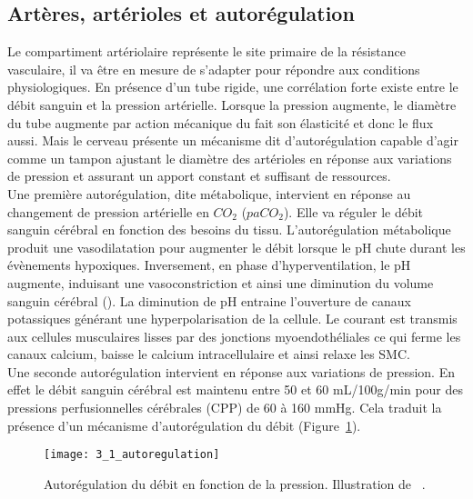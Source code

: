 \subsection{Artères, artérioles et autorégulation}
Le compartiment artériolaire représente le site primaire de la résistance vasculaire, il va être
en mesure de s’adapter pour répondre aux conditions physiologiques. En présence d’un tube rigide,
une corrélation forte existe entre le débit sanguin et la pression artérielle. Lorsque la pression
augmente, le diamètre du tube augmente par action mécanique du fait son élasticité et donc le flux
aussi. Mais le cerveau présente un mécanisme dit d’autorégulation capable d’agir comme un tampon
ajustant le diamètre des artérioles en réponse aux variations de pression et assurant un apport
constant et suffisant de ressources.\\			
Une première autorégulation, dite métabolique, intervient en réponse au changement de
pression artérielle en $CO_2$ ($paCO_2$). Elle va réguler le débit sanguin cérébral en fonction des besoins du
tissu. L’autorégulation métabolique produit une vasodilatation pour augmenter le débit lorsque le pH
chute durant les évènements hypoxiques. Inversement, en phase d’hyperventilation, le pH augmente,
induisant une vasoconstriction et ainsi une diminution du volume sanguin cérébral (\cite{Hajjar2010}). La diminution
de pH entraine l’ouverture de canaux potassiques générant une hyperpolarisation de la cellule. Le
courant est transmis aux cellules musculaires lisses par des jonctions myoendothéliales ce qui ferme
les canaux calcium, baisse le calcium intracellulaire et ainsi relaxe les SMC.\\	
Une seconde autorégulation intervient en réponse aux variations de pression. En effet le débit
sanguin cérébral est maintenu entre 50 et 60 mL/100g/min pour des pressions perfusionnelles cérébrales (CPP) de 60 à 160 mmHg. Cela traduit la présence d’un mécanisme d’autorégulation du
débit (Figure~\ref{fig:3_1_autoregulation}). 
\begin{figure}[!t]
\centering
\texttt{[image: 3\_1\_autoregulation]}
\caption{Autorégulation du débit en fonction de la pression. Illustration de ~\cite{Lang2003}.}
\label{fig:3_1_autoregulation}	
\end{figure}

